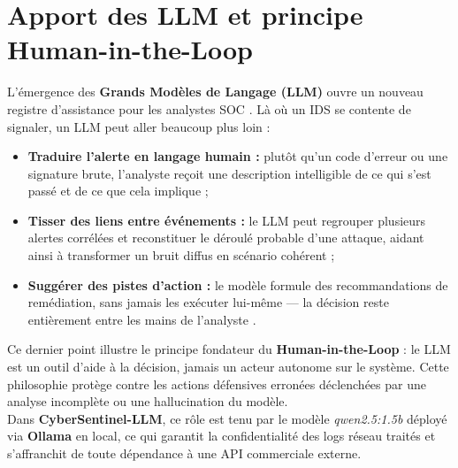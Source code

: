 \documentclass[12pt,a4paper]{report}
\begin{document}
\section{Apport des LLM et principe Human-in-the-Loop}
\begin{onehalfspace}
L'émergence des \textbf{Grands Modèles de Langage (LLM)} ouvre un nouveau
registre d'assistance pour les analystes SOC \cite{motlagh2024llm}. Là où un
IDS se contente de signaler, un LLM peut aller beaucoup plus loin :

\begin{itemize}
  \item[\ding{43}] \textbf{Traduire l'alerte en langage humain :} plutôt
  qu'un code d'erreur ou une signature brute, l'analyste reçoit une
  description intelligible de ce qui s'est passé et de ce que cela implique ;
  \item[\ding{43}] \textbf{Tisser des liens entre événements :} le LLM peut
  regrouper plusieurs alertes corrélées et reconstituer le déroulé probable
  d'une attaque, aidant ainsi à transformer un bruit diffus en scénario
  cohérent ;
  \item[\ding{43}] \textbf{Suggérer des pistes d'action :} le modèle formule
  des recommandations de remédiation, sans jamais les exécuter lui-même —
  la décision reste entièrement entre les mains de l'analyste
  \cite{houssel2024explainable}.
\end{itemize}

Ce dernier point illustre le principe fondateur du \textbf{Human-in-the-Loop} :
le LLM est un outil d'aide à la décision, jamais un acteur autonome sur le
système. Cette philosophie protège contre les actions défensives erronées
déclenchées par une analyse incomplète ou une hallucination du modèle.\\

Dans \textbf{CyberSentinel-LLM}, ce rôle est tenu par le modèle
\textit{qwen2.5:1.5b} déployé via \textbf{Ollama} en local, ce qui garantit
la confidentialité des logs réseau traités et s'affranchit de toute
dépendance à une API commerciale externe.
\end{onehalfspace}
\end{document}

